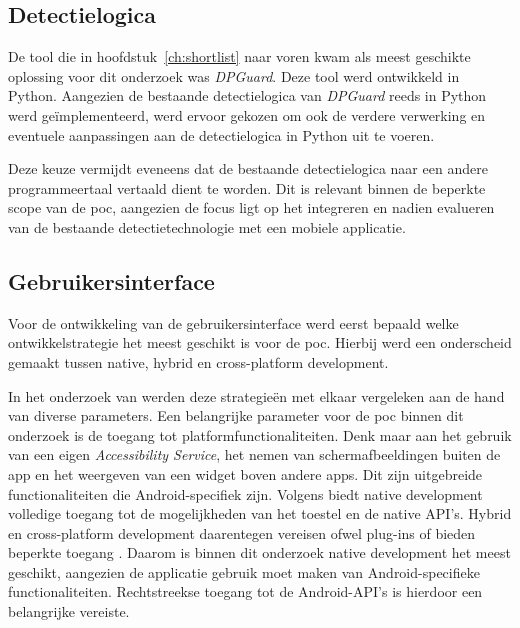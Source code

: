 \vspace{1em}

\subsection{Detectielogica}
\label{subsec:detectielogica}

\vspace{1em}

De tool die in hoofdstuk~\ref{ch:shortlist} naar voren kwam als meest geschikte oplossing voor dit onderzoek was \textit{DPGuard}. Deze tool werd ontwikkeld in Python. Aangezien de bestaande detectielogica van \textit{DPGuard} reeds in Python werd geïmplementeerd, werd ervoor gekozen om ook de verdere verwerking en eventuele aanpassingen aan de detectielogica in Python uit te voeren.

\vspace{1em}

Deze keuze vermijdt eveneens dat de bestaande detectielogica naar een andere programmeertaal vertaald dient te worden. Dit is relevant binnen de beperkte scope van de \acrshort{poc}, aangezien de focus ligt op het integreren en nadien evalueren van de bestaande detectietechnologie met een mobiele applicatie.

\vspace{1em}


\subsection{Gebruikersinterface}
\label{subsec:gebruikersinterface}

\vspace{1em}

Voor de ontwikkeling van de gebruikersinterface werd eerst bepaald welke ontwikkelstrategie het meest geschikt is voor de \acrshort{poc}. Hierbij werd een onderscheid gemaakt tussen native, hybrid en cross-platform development.

\vspace{1em}

In het onderzoek van \textcite{Zarichuk2023} werden deze strategieën met elkaar vergeleken aan de hand van diverse parameters. Een belangrijke parameter voor de \acrshort{poc} binnen dit onderzoek is de toegang tot platformfunctionaliteiten. Denk maar aan het gebruik van een eigen \textit{Accessibility Service}, het nemen van schermafbeeldingen buiten de app en het weergeven van een widget boven andere apps. Dit zijn uitgebreide functionaliteiten die Android-specifiek zijn. Volgens \textcite{Zarichuk2023} biedt native development volledige toegang tot de mogelijkheden van het toestel en de native API's. Hybrid en cross-platform development daarentegen vereisen ofwel plug-ins of bieden beperkte toegang \autocite{Zarichuk2023}. Daarom is binnen dit onderzoek native development het meest geschikt, aangezien de applicatie gebruik moet maken van Android-specifieke functionaliteiten. Rechtstreekse toegang tot de Android-API's is hierdoor een belangrijke vereiste. 

